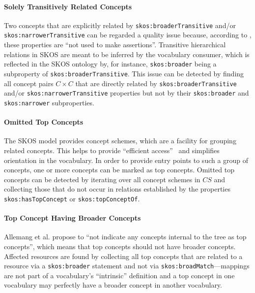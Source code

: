 {\paragraph{Solely Transitively Related Concepts}

Two concepts that are explicitly related by \texttt{skos:broaderTransitive} and/or \texttt{skos:narrowerTransitive} can be regarded a quality issue because, according to \cite{SkosReference2008}, these properties are ``not used to make assertions''. Transitive hierarchical relations in SKOS are meant to be inferred by the vocabulary consumer, which is reflected in the SKOS ontology by, for instance, \texttt{skos:broader} being a subproperty of \texttt{skos:broaderTransitive}. 
This issue can be detected by finding all concept pairs $C \times C$ that are directly related by \texttt{skos:broaderTransitive} and/or \texttt{skos:narrowerTransitive} properties but not by their \texttt{skos:broader} and \texttt{skos:narrower} subproperties.

\paragraph{Omitted Top Concepts}

The SKOS model provides concept schemes, which are a facility for grouping related concepts. This helps to provide ``efficient access''~\cite{Isaac2009} and simplifies orientation in the vocabulary. In order to provide entry points to such a group of concepts, one or more concepts can be marked as top concepts.  
Omitted top concepts can be detected by iterating over all concept schemes in $CS$ and collecting those that do not occur in relations established by the properties \texttt{skos:hasTopConcept} or \texttt{skos:topConceptOf}.

\paragraph{Top Concept Having Broader Concepts}

Allemang et al. \cite{Allemang2011} propose to ``not indicate any concepts internal to the tree as top concepts'', which means that top concepts should not have broader concepts. 
Affected resources are found by collecting all top concepts that are related to a resource via a \texttt{skos:broader} statement and not via \texttt{skos:broadMatch}---mappings are not part of a vocabulary's ``intrinsic'' definition and a top concept in one vocabulary may perfectly have a broader concept in another vocabulary.

}
